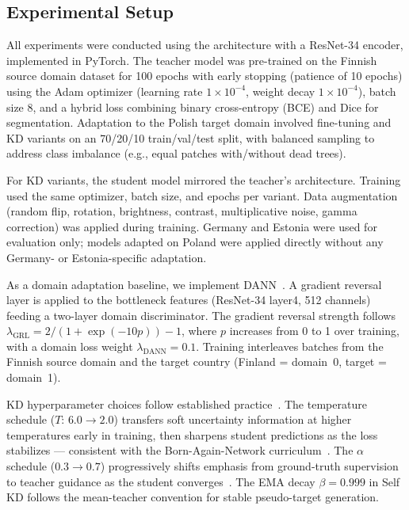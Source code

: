\documentclass[twocolumn]{article}
\begin{document}
\subsection{Experimental Setup}

All experiments were conducted using the \oursone architecture with a ResNet-34 encoder, implemented in PyTorch. The teacher model was pre-trained on the Finnish source domain dataset for 100 epochs with early stopping (patience of 10 epochs) using the Adam optimizer (learning rate $1 \times 10^{-4}$, weight decay $1 \times 10^{-4}$), batch size 8, and a hybrid loss combining binary cross-entropy (BCE) and Dice for segmentation. Adaptation to the Polish target domain involved fine-tuning and KD variants on an 70/20/10 train/val/test split, with balanced sampling to address class imbalance (e.g., equal patches with/without dead trees).

For KD variants, the student model mirrored the teacher's architecture. Training used the same optimizer, batch size, and epochs per variant. Data augmentation (random flip, rotation, brightness, contrast, multiplicative noise, gamma correction) was applied during training. Germany and Estonia were used for evaluation only; models adapted on Poland were applied directly without any Germany- or Estonia-specific adaptation.

As a domain adaptation baseline, we implement DANN~\citep{ganin2016domain}. A gradient reversal layer is applied to the bottleneck features (ResNet-34 layer4, 512 channels) feeding a two-layer domain discriminator. The gradient reversal strength follows $\lambda_{\text{GRL}} = 2/(1+\exp(-10p))-1$, where $p$ increases from 0 to 1 over training, with a domain loss weight $\lambda_{\text{DANN}}=0.1$. Training interleaves batches from the Finnish source domain and the target country (Finland = domain~0, target = domain~1).

KD hyperparameter choices follow established practice~\citep{hinton2015distilling,furlanello2018born}. The temperature schedule ($T$: $6.0\!\to\!2.0$) transfers soft uncertainty information at higher temperatures early in training, then sharpens student predictions as the loss stabilizes — consistent with the Born-Again-Network curriculum~\citep{furlanello2018born}. The $\alpha$ schedule ($0.3\!\to\!0.7$) progressively shifts emphasis from ground-truth supervision to teacher guidance as the student converges~\citep{hinton2015distilling}. The EMA decay $\beta=0.999$ in Self KD follows the mean-teacher convention for stable pseudo-target generation.
\end{document}
